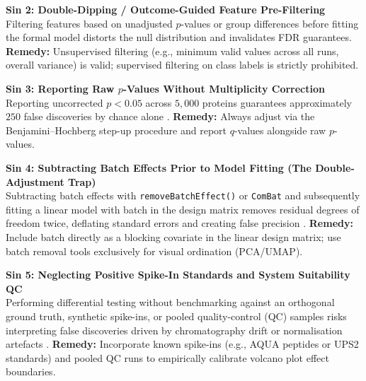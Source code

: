 \documentclass[11pt,twoside,openright]{book}
\begin{document}
\begin{pitfallbox}
\textbf{Sin 2: Double-Dipping / Outcome-Guided Feature Pre-Filtering}\\
Filtering features based on unadjusted $p$-values or group differences before fitting the formal model distorts the null distribution and invalidates FDR guarantees. \textbf{Remedy:} Unsupervised filtering (e.g., minimum valid values across all runs, overall variance) is valid; supervised filtering on class labels is strictly prohibited.
\end{pitfallbox}

\begin{pitfallbox}
\textbf{Sin 3: Reporting Raw $p$-Values Without Multiplicity Correction}\\
Reporting uncorrected $p < 0.05$ across $5,000$ proteins guarantees approximately $250$ false discoveries by chance alone \cite{benjamini1995controlling}. \textbf{Remedy:} Always adjust via the Benjamini--Hochberg step-up procedure and report $q$-values alongside raw $p$-values.
\end{pitfallbox}

\begin{pitfallbox}
\textbf{Sin 4: Subtracting Batch Effects Prior to Model Fitting (The Double-Adjustment Trap)}\\
Subtracting batch effects with \texttt{removeBatchEffect()} or \texttt{ComBat} \cite{johnson2007adjusting} and subsequently fitting a linear model with batch in the design matrix removes residual degrees of freedom twice, deflating standard errors and creating false precision \cite{leek2010tackling}. \textbf{Remedy:} Include batch directly as a blocking covariate in the linear design matrix; use batch removal tools exclusively for visual ordination (PCA/UMAP).
\end{pitfallbox}

\begin{pitfallbox}
\textbf{Sin 5: Neglecting Positive Spike-In Standards and System Suitability QC}\\
Performing differential testing without benchmarking against an orthogonal ground truth, synthetic spike-ins, or pooled quality-control (QC) samples risks interpreting false discoveries driven by chromatography drift or normalisation artefacts \cite{bruderer2017optimization, navarro2016multicenter, broadhurst2018guidelines}. \textbf{Remedy:} Incorporate known spike-ins (e.g., AQUA peptides or UPS2 standards) and pooled QC runs to empirically calibrate volcano plot effect boundaries.
\end{pitfallbox}
\end{document}
